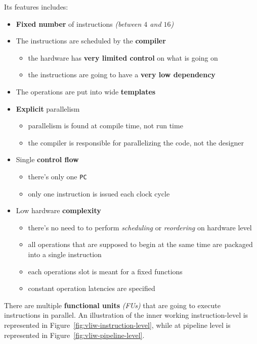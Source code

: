 \documentclass[english]{article}
\begin{document}
\bigskip
Its features includes:

\begin{itemize}
  \item \textbf{Fixed number} of instructions \textit{(between \(4\) and \(16\))}
  \item The instructions are scheduled by the \textbf{compiler}
        \begin{itemize}
          \item the hardware has \textbf{very limited control} on what is going on
          \item the instructions are going to have a \textbf{very low dependency}
        \end{itemize}
  \item The operations are put into wide \textbf{templates}
  \item \textbf{Explicit} parallelism
        \begin{itemize}
          \item parallelism is found at compile time, not run time
          \item the compiler is responsible for parallelizing the code, not the designer
        \end{itemize}
  \item Single \textbf{control flow}
        \begin{itemize}
          \item there's only one \texttt{PC}
          \item only one instruction is issued each clock cycle
        \end{itemize}
  \item Low hardware \textbf{complexity}
        \begin{itemize}
          \item there's no need to to perform \textit{scheduling} or \textit{reordering} on hardware level
          \item all operations that are supposed to begin at the same time are packaged into a single instruction
          \item each operations slot is meant for a fixed functions
          \item constant operation latencies are specified
        \end{itemize}
\end{itemize}

There are multiple \textbf{functional units} \textit{(FUs)} that are going to execute instructions in parallel.
An illustration of the inner working instruction-level is represented in Figure~\ref{fig:vliw-instruction-level}, while at pipeline level is represented in Figure~\ref{fig:vliw-pipeline-level}.
\end{document}
